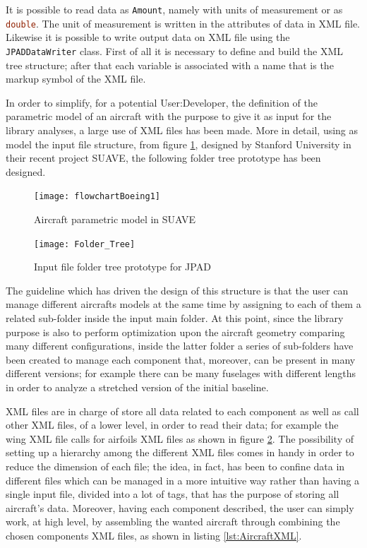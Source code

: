 \bigskip
\noindent
It is possible to read data as \lstinline[language=Java]!Amount!\cite{jscienceAmount}, namely with units of measurement or as \lstinline[language=Java]!double!. The unit of measurement is written in the attributes of data in XML file.
%
Likewise it is possible to write output data on XML file using the \lstinline[language=Java]!JPADDataWriter! class. First of all it is necessary to define and build the XML tree structure; after that each variable is associated with a name that is the markup symbol of the XML file.

\bigskip
\noindent
In order to simplify, for a potential \gls{User:Developer}, the definition of the parametric model of an aircraft with the purpose to give it as input for the library analyses, a large use of XML files has been made. More in detail, using as model the input file structure, from figure \ref{fig:SUAVE1}, designed by Stanford University in their recent project SUAVE\cite{SUAVE}, the following folder tree prototype has been designed.
%
\begin{figure}[!t]
\centering
\texttt{[image: flowchartBoeing1]}
\caption{Aircraft parametric model in SUAVE}
\label{fig:SUAVE1}
\end{figure}
%
\begin{figure}[!b]
\centering
\texttt{[image: Folder\_Tree]}
\caption{Input file folder tree prototype for \gls{JPAD}}
\label{fig:inputJPAD}
\end{figure}

\bigskip
\noindent
The guideline which has driven the design of this structure is that the user can manage different aircrafts models at the same time by assigning to each of them a related sub-folder inside the input main folder. At this point, since the library purpose is also to perform optimization upon the aircraft geometry comparing many different configurations, inside the latter folder a series of sub-folders have been created to manage each component that, moreover, can be present in many different versions; for example there can be many fuselages with different lengths in order to analyze a stretched version of the initial baseline. 

\bigskip
\noindent
XML files are in charge of store all data related to each component as well as call other XML files, of a lower level, in order to read their data; for example the wing XML file calls for airfoils XML files as shown in figure \ref{fig:inputJPAD}. The possibility of setting up a hierarchy among the different XML files comes in handy in order to reduce the dimension of each file; the idea, in fact, has been to confine data in different files which can be managed in a more intuitive way rather than having a single input file, divided into a lot of tags, that has the purpose of storing all aircraft's data. Moreover, having each component described, the user can simply work, at high level, by assembling the wanted aircraft through combining the chosen components XML files, as shown in listing \ref{lst:AircraftXML}.

